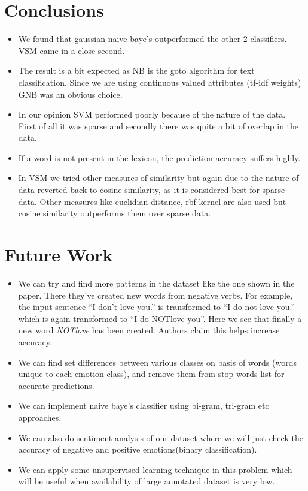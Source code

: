 \section{Conclusions}
\label{sec-conclusion}
\begin{itemize}
\item We found that gaussian naive baye's outperformed the other 2 classifiers. VSM came in a close second.
\item The result is a bit expected as NB is the goto algorithm for text classification. Since we are using continuous valued attributes (tf-idf weights) GNB was an obvious choice.
\item In our opinion SVM performed poorly because of the nature of the data. First of all it was sparse and secondly there was quite a bit of overlap in the data.
\item If a word is not present in the lexicon, the prediction accuracy suffers highly.
\item In VSM we tried other measures of similarity but again due to the nature of data reverted back to cosine similarity, as it is considered best for sparse data. Other measures like euclidian distance, rbf-kernel are also used but cosine similarity outperforms them over sparse data.
\end{itemize}

\newpage
\section{Future Work}
\label{sec-plan-for-sem}
\begin{itemize}
 \item We can try and find more patterns in the dataset like the one shown in the paper. There they've created new words from negative verbs. For example, the input sentence ``I don't love you.'' is transformed to ``I do not love you.'' which is again transformed to ``I do NOTlove you''. Here we see that finally a new word \emph{NOTlove} has been created. Authors claim this helps increase accuracy.
 \item We can find set differences between various classes on basis of words (words unique to each emotion class), and remove them from stop words list for accurate predictions.
 \item We can implement naive baye's classifier using bi-gram, tri-gram etc approaches.
 \item We can also do sentiment analysis of our dataset where we will just check the accuracy of negative and positive emotions(binary classification).
 \item We can apply some unsupervised learning technique in this problem which will be useful when availability of large annotated dataset is very low.
\end{itemize}
